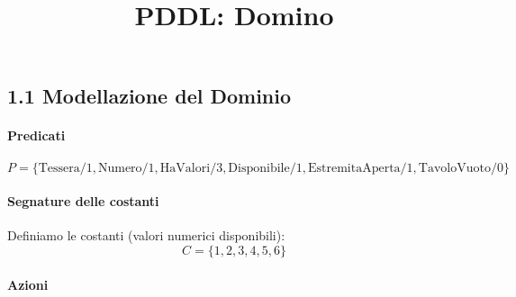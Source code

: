 \documentclass[a4paper,11pt]{article}
\title{PDDL: Domino}
\date{}
\begin{document}
\maketitle

\subsection*{1.1 Modellazione del Dominio} 

\paragraph{Predicati}
\[ P = \{\text{Tessera}/1, \text{Numero}/1, \text{HaValori}/3, \text{Disponibile}/1, \text{EstremitaAperta}/1, \text{TavoloVuoto}/0\} \]

\paragraph{Segnature delle costanti}
Definiamo le costanti (valori numerici disponibili):
\[ C = \{1, 2, 3, 4, 5, 6\} \]

\paragraph{Azioni}
\end{document}
